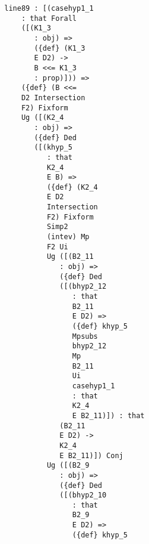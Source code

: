 \documentclass[12pt]{article}
\begin{document}
\begin{verbatim}
                           line89 : [(casehyp1_1 
                               : that Forall 
                               ([(K1_3 
                                  : obj) => 
                                  ({def} (K1_3 
                                  E D2) -> 
                                  B <<= K1_3 
                                  : prop)])) => 
                               ({def} (B <<= 
                               D2 Intersection 
                               F2) Fixform 
                               Ug ([(K2_4 
                                  : obj) => 
                                  ({def} Ded 
                                  ([(khyp_5 
                                     : that 
                                     K2_4 
                                     E B) => 
                                     ({def} (K2_4 
                                     E D2 
                                     Intersection 
                                     F2) Fixform 
                                     Simp2 
                                     (intev) Mp 
                                     F2 Ui 
                                     Ug ([(B2_11 
                                        : obj) => 
                                        ({def} Ded 
                                        ([(bhyp2_12 
                                           : that 
                                           B2_11 
                                           E D2) => 
                                           ({def} khyp_5 
                                           Mpsubs 
                                           bhyp2_12 
                                           Mp 
                                           B2_11 
                                           Ui 
                                           casehyp1_1 
                                           : that 
                                           K2_4 
                                           E B2_11)]) : that 
                                        (B2_11 
                                        E D2) -> 
                                        K2_4 
                                        E B2_11)]) Conj 
                                     Ug ([(B2_9 
                                        : obj) => 
                                        ({def} Ded 
                                        ([(bhyp2_10 
                                           : that 
                                           B2_9 
                                           E D2) => 
                                           ({def} khyp_5 

\end{verbatim}
\end{document}

